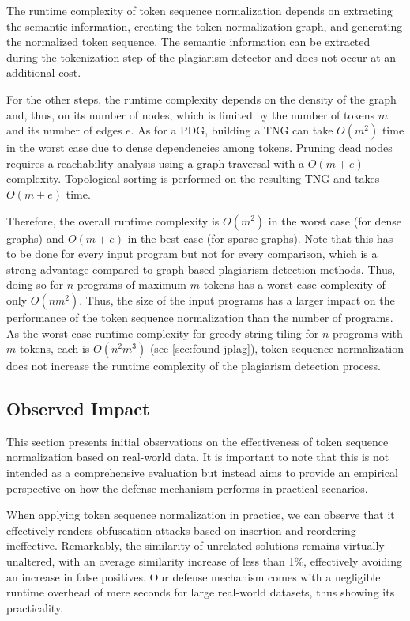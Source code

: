 The runtime complexity of token sequence normalization depends on extracting the semantic information, creating the token normalization graph, and generating the normalized token sequence.
The semantic information can be extracted during the tokenization step of the plagiarism detector and does not occur at an additional cost.

For the other steps, the runtime complexity depends on the density of the graph and, thus, on its number of nodes, which is limited by the number of tokens $m$ and its number of edges $e$.
As for a PDG, building a TNG can take $O(m^2)$ time in the worst case due to dense dependencies among tokens.
Pruning dead nodes requires a reachability analysis using a graph traversal with a $O(m + e)$ complexity. Topological sorting is performed on the resulting TNG and takes $O(m + e)$ time.

Therefore, the overall runtime complexity is $O(m^2)$ in the worst case (for dense graphs) and $O(m + e)$ in the best case (for sparse graphs).
Note that this has to be done for every input program but not for every comparison, which is a strong advantage compared to graph-based plagiarism detection methods. Thus, doing so for $n$ programs of maximum $m$ tokens has a worst-case complexity of only $O(nm^2)$. Thus, the size of the input programs has a larger impact on the performance of the token sequence normalization than the number of programs.
%
As the worst-case runtime complexity for greedy string tiling for $n$ programs with $m$ tokens, each is \( O(n^2m^3) \) (see \autoref{sec:found-jplag}), token sequence normalization does not increase the runtime complexity of the plagiarism detection process.


\subsection{Observed Impact}
This section presents initial observations on the effectiveness of token sequence normalization based on real-world data. It is important to note that this is not intended as a comprehensive evaluation but instead aims to provide an empirical perspective on how the defense mechanism performs in practical scenarios.

When applying token sequence normalization in practice, we can observe that it effectively renders obfuscation attacks based on insertion and reordering ineffective.
Remarkably, the similarity of unrelated solutions remains virtually unaltered, with an average similarity increase of less than 1\%, effectively avoiding an increase in false positives.
Our defense mechanism comes with a negligible runtime overhead of mere seconds for large real-world datasets, thus showing its practicality.

